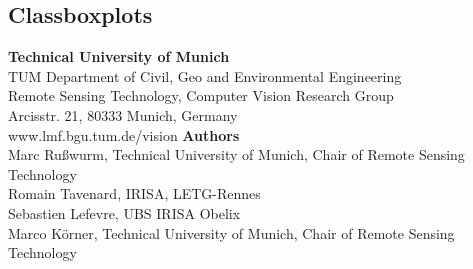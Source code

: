 \documentclass[a0]{tumposter}
\begin{document}
\begin{minipage}[t]{.32\textwidth}
\begin{table}
	\end{table}
	
	\subsection{Classboxplots}
	
	
	
\end{minipage}

\begin{footer}
	\begin{multicols}{2}
		\textbf{Technical University of Munich}\\
		TUM Department of Civil, Geo and Environmental Engineering \\
		Remote Sensing Technology, Computer Vision Research Group \\
		Arcisstr. 21, 80333 Munich, Germany \\
		www.lmf.bgu.tum.de/vision
	\vfill\columnbreak
		\textbf{Authors} \\
		Marc Rußwurm, Technical University of Munich, Chair of Remote Sensing Technology \\
		Romain Tavenard, IRISA, LETG-Rennes \\
		Sebastien Lefevre, UBS IRISA Obelix  \\
		Marco Körner, Technical University of Munich, Chair of Remote Sensing Technology
	\vfill
	\end{multicols}
\end{footer}
\end{document}
